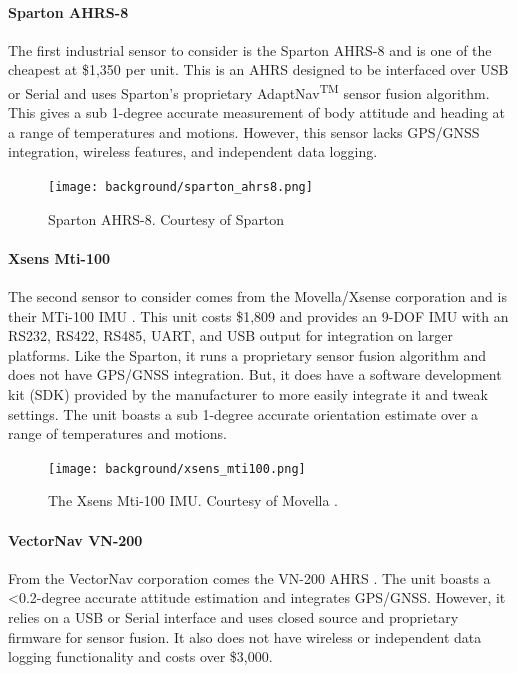 \paragraph*{Sparton AHRS-8} The first industrial sensor to consider is the Sparton AHRS-8 \cite{Sparton} and is one of the cheapest at \$1,350 per unit.
This is an AHRS designed to be interfaced over USB or Serial and uses Sparton's proprietary AdaptNav\textsuperscript{TM} sensor fusion algorithm.
This gives a sub 1-degree accurate measurement of body attitude and heading at a range of temperatures and motions.
However, this sensor lacks GPS/GNSS integration, wireless features, and independent data logging.

\begin{figure}
    \centering
    \caption[Sparton AHRS-8]{Sparton AHRS-8.
    Courtesy of Sparton \cite{Sparton}}
    \texttt{[image: background/sparton\_ahrs8.png]}
\end{figure}

\paragraph*{Xsens Mti-100} The second sensor to consider comes from the Movella/Xsense corporation and is their MTi-100 IMU \cite{Movella}.
This unit costs \$1,809 and provides an 9-DOF IMU with an RS232, RS422, RS485, UART, and USB output for integration on larger platforms.
Like the Sparton, it runs a proprietary sensor fusion algorithm and does not have GPS/GNSS integration.
But, it does have a software development kit (SDK) provided by the manufacturer to more easily integrate it and tweak settings.
The unit boasts a sub 1-degree accurate orientation estimate over a range of temperatures and motions.

\begin{figure}
    \centering
    \caption[Xsens Mti-100]{The Xsens Mti-100 IMU.
    Courtesy of Movella \cite{Movella}.}
    \texttt{[image: background/xsens\_mti100.png]}
\end{figure}

\paragraph*{VectorNav VN-200} From the VectorNav corporation comes the VN-200 AHRS \cite{VectorNav:VN200}.
The unit boasts a \textless 0.2-degree accurate attitude estimation and integrates GPS/GNSS.
However, it relies on a USB or Serial interface and uses closed source and proprietary firmware for sensor fusion.
It also does not have wireless or independent data logging functionality and costs over \$3,000.

